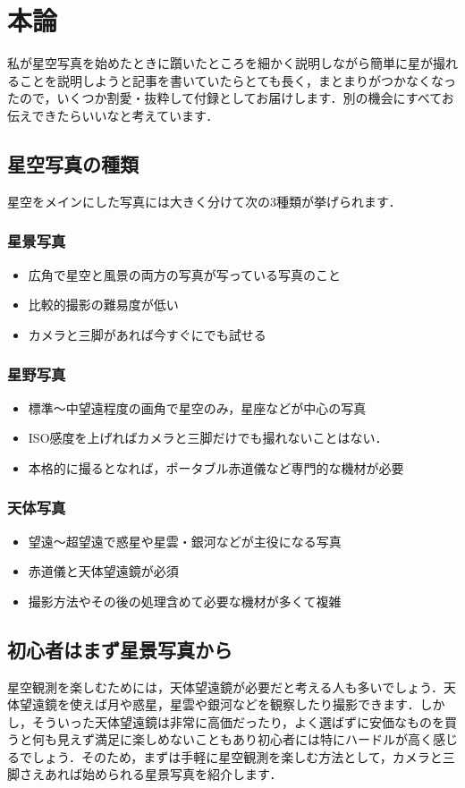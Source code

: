 \documentclass[main]{subfiles}
\begin{document}
\chapter{本論}
私が星空写真を始めたときに躓いたところを細かく説明しながら簡単に星が撮れることを説明しようと記事を書いていたらとても長く，まとまりがつかなくなったので，いくつか割愛・抜粋して付録としてお届けします．別の機会にすべてお伝えできたらいいなと考えています．
\section{星空写真の種類}
星空をメインにした写真には大きく分けて次の3種類が挙げられます．
\subsection{星景写真}
\begin{itemize}
	\item 広角で星空と風景の両方の写真が写っている写真のこと
	\item 比較的撮影の難易度が低い
	\item カメラと三脚があれば今すぐにでも試せる
\end{itemize}
\subsection{星野写真}
\begin{itemize}
	\item 標準～中望遠程度の画角で星空のみ，星座などが中心の写真
	\item ISO感度を上げればカメラと三脚だけでも撮れないことはない．
	\item 本格的に撮るとなれば，ポータブル赤道儀など専門的な機材が必要
\end{itemize}
\subsection{天体写真}
\begin{itemize}
	\item 望遠～超望遠で惑星や星雲・銀河などが主役になる写真
	\item 赤道儀と天体望遠鏡が必須
	\item 撮影方法やその後の処理含めて必要な機材が多くて複雑
\end{itemize}
\section{初心者はまず星景写真から}
星空観測を楽しむためには，天体望遠鏡が必要だと考える人も多いでしょう．天体望遠鏡を使えば月や惑星，星雲や銀河などを観察したり撮影できます．しかし，そういった天体望遠鏡は非常に高価だったり，よく選ばずに安価なものを買うと何も見えず満足に楽しめないこともあり初心者には特にハードルが高く感じるでしょう．そのため，まずは手軽に星空観測を楽しむ方法として，カメラと三脚さえあれば始められる星景写真を紹介します．
\end{document}
